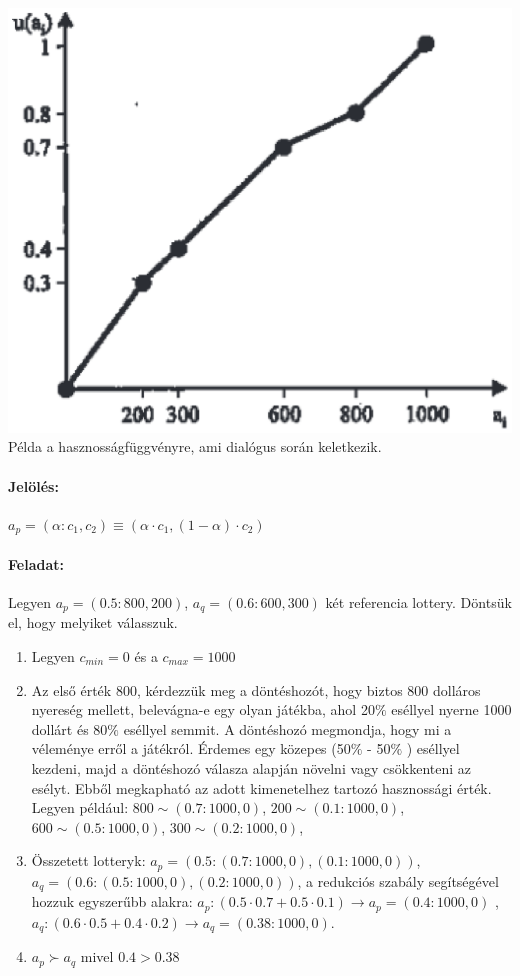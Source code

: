 \documentclass[a4paper,12pt]{article}
\begin{document}
\begin{center}

\includegraphics[scale=0.7]{utilmake}
\\
Példa a hasznosságfüggvényre, ami dialógus során keletkezik.
\end{center}

\paragraph{Jelölés: } $a_p = (\alpha: c_1, c_2) \equiv (\alpha \cdot c_1, (1-\alpha) \cdot c_2) $

\paragraph{Feladat: } Legyen $a_p = (0.5:800, 200)$, $a_q = (0.6:600, 300)$ két referencia lottery. Döntsük el, hogy melyiket válasszuk. 

\begin{enumerate}
\item Legyen $c_{min} = 0$ és a $c_{max} = 1000$
\item Az első érték 800, kérdezzük meg a döntéshozót, hogy biztos 800 dolláros nyereség mellett, belevágna-e egy olyan játékba, ahol 20$\%$ eséllyel nyerne 1000 dollárt és 80$\%$  eséllyel semmit. A döntéshozó megmondja, hogy mi a véleménye erről a játékról. Érdemes egy közepes (50$\%$ - 50$\%$ ) eséllyel kezdeni, majd a döntéshozó válasza alapján növelni vagy csökkenteni az esélyt. Ebből megkapható az adott kimenetelhez tartozó hasznossági érték. Legyen például: $800 \sim (0.7:1000, 0)$, $200 \sim (0.1:1000, 0)$, $600 \sim (0.5:1000, 0)$, $300 \sim (0.2:1000, 0)$,
  
\item Összetett lotteryk:  $a_p = (0.5:(0.7:1000, 0), (0.1:1000, 0))$, $a_q = (0.6:(0.5:1000, 0), (0.2:1000, 0))$, a redukciós szabály segítségével hozzuk egyszerűbb alakra: $a_p : (0.5\cdot 0.7+0.5\cdot 0.1) \rightarrow a_p=(0.4:1000, 0)$ , $a_q : (0.6\cdot 0.5+0.4\cdot 0.2) \rightarrow a_q = (0.38:1000, 0)$.
\item $a_p \succ a_q$ mivel $0.4 > 0.38$
\end{enumerate}
\end{document}
